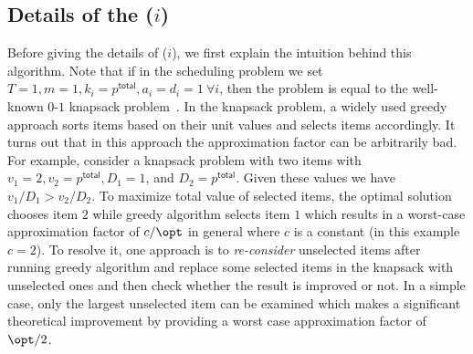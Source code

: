 \begin{comment}
\vspace{-3mm}

\subsection{OLP algorithm}	
\label{app:olp}

The Online Linear Program (OLP) \cite{lee2016adaptive} is a greedy algorithm that works as follows:
(i) at $t=1$ compute the optimal solution (e.g., by a solver) for the current set of EVs assuming that there will be no further arrival. (ii) use the solution until there is a new arrival. (iii) when an EV arrives, construct and solve a new problem by considering the new arrivals and the remaining demand of previously arrived EVs which are still active. (iv) go back to (ii).

The original OLP algorithm which is implemented in Caltech ACN works only for integral revenue model and under different cost functions including the revenue of the charging stations, which is the case of our study. In this paper, we implemented the algorithm for both integral and fractional model. The difference between the two versions is in the constraint set of the optimization problem that should be solved such that in integral model, the total amount of resource that an EV receives can only be equal to zero or its demand while in fractional model it can be any non-negative value less than or equal to the demand. 

\end{comment}

\subsection{Details of the \rc($i$)}
\label{sec:rc}
		Before giving the details of \rc($i$), we first explain the intuition behind this algorithm. 
		 Note that if in the scheduling problem we set $T=1, m=1, k_i=p^\mathsf{total}, a_i=d_i=1\ \forall i$, then the problem is equal to the well-known $0$-$1$ knapsack problem~\cite{approx}. In the knapsack problem, a widely used greedy approach sorts items based on their unit values and selects items accordingly. It turns out that in this approach the approximation factor can be arbitrarily bad. For example, consider a knapsack problem with two items with $v_1=2, v_2=p^\mathsf{total}, D_1=1$, and  $D_2=p^\mathsf{total}$. Given these values we have $v_1\slash D_1>v_2\slash D_2$. To maximize total value of selected items, the optimal solution chooses item $2$ while greedy algorithm selects item $1$ which results in a worst-case approximation factor of ${c \slash \opt}$ in general where $c$ is a constant (in this example $c=2$). To resolve it, one approach is to \emph{re-consider} unselected items after running greedy algorithm and replace some selected items in the knapsack with unselected ones and then check whether the result is improved or not. In a simple case, only the largest unselected item can be examined which makes a significant theoretical improvement by providing a worst case approximation factor of $\opt\slash 2$.
	 
